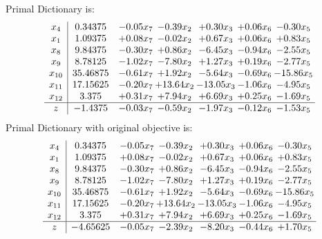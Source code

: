 \documentclass[8pt]{article}
\begin{document}
Primal Dictionary is:
\[\begin{array}{c| c c@{\hskip 2pt} c@{\hskip 2pt} c@{\hskip 2pt} c@{\hskip 2pt} c@{\hskip 2pt} }
 x_{4}   &  0.34375 & -0.05 x_{7} & -0.39 x_{2} & +  0.30 x_{3} & +  0.06 x_{6} & -0.30 x_{5}\\
 x_{1}   &  1.09375 & +  0.08 x_{7} & -0.02 x_{2} & +  0.67 x_{3} & +  0.06 x_{6} & +  0.83 x_{5}\\
 x_{8}   &  9.84375 & -0.30 x_{7} & +  0.86 x_{2} & -6.45 x_{3} & -0.94 x_{6} & -2.55 x_{5}\\
 x_{9}   &  8.78125 & -1.02 x_{7} & -7.80 x_{2} & +  1.27 x_{3} & +  0.19 x_{6} & -2.77 x_{5}\\
 x_{10}   &  35.46875 & -0.61 x_{7} & +  1.92 x_{2} & -5.64 x_{3} & -0.69 x_{6} & -15.86 x_{5}\\
 x_{11}   &  17.15625 & -0.20 x_{7} & + 13.64 x_{2} & -13.05 x_{3} & -1.06 x_{6} & -4.95 x_{5}\\
 x_{12}   &  3.375 & +  0.31 x_{7} & +  7.94 x_{2} & +  6.69 x_{3} & +  0.25 x_{6} & -1.69 x_{5}\\
\hline
z    &  -1.4375 & -0.03 x_{7} & -0.59 x_{2} & -1.97 x_{3} & -0.12 x_{6} & -1.53 x_{5}\\
\end{array}\]
Primal Dictionary with original objective is:
\[\begin{array}{c| c c@{\hskip 2pt} c@{\hskip 2pt} c@{\hskip 2pt} c@{\hskip 2pt} c@{\hskip 2pt} }
 x_{4}   &  0.34375 & -0.05 x_{7} & -0.39 x_{2} & +  0.30 x_{3} & +  0.06 x_{6} & -0.30 x_{5}\\
 x_{1}   &  1.09375 & +  0.08 x_{7} & -0.02 x_{2} & +  0.67 x_{3} & +  0.06 x_{6} & +  0.83 x_{5}\\
 x_{8}   &  9.84375 & -0.30 x_{7} & +  0.86 x_{2} & -6.45 x_{3} & -0.94 x_{6} & -2.55 x_{5}\\
 x_{9}   &  8.78125 & -1.02 x_{7} & -7.80 x_{2} & +  1.27 x_{3} & +  0.19 x_{6} & -2.77 x_{5}\\
 x_{10}   &  35.46875 & -0.61 x_{7} & +  1.92 x_{2} & -5.64 x_{3} & -0.69 x_{6} & -15.86 x_{5}\\
 x_{11}   &  17.15625 & -0.20 x_{7} & + 13.64 x_{2} & -13.05 x_{3} & -1.06 x_{6} & -4.95 x_{5}\\
 x_{12}   &  3.375 & +  0.31 x_{7} & +  7.94 x_{2} & +  6.69 x_{3} & +  0.25 x_{6} & -1.69 x_{5}\\
\hline
z    &  -4.65625 & -0.05 x_{7} & -2.39 x_{2} & -8.20 x_{3} & -0.44 x_{6} & +  1.70 x_{5}\\
\end{array}\]
\end{document}
